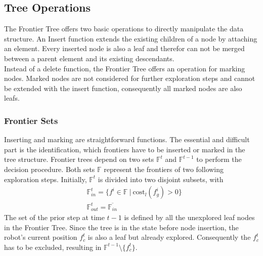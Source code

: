 \documentclass[twocolumn]{svjour3}[2016]
\begin{document}
\subsection{Tree Operations}
\label{tfta:operations}
The Frontier Tree offers two basic operations to directly manipulate the data structure. An Insert function extends the existing children of a node by attaching an element. Every inserted node is also a leaf and therefor can not be merged between a parent element and its existing descendants.\\
Instead of a delete function, the Frontier Tree offers an operation for marking nodes. Marked nodes are not considered for further exploration steps and cannot be extended with the insert function, consequently all marked nodes are also leafs.\\
\subsubsection{Frontier Sets}
Inserting and marking are straightforward functions. The essential and difficult part is the identification, which frontiers have to be inserted or marked in the tree structure. Frontier trees depend on two sets $\mathbb{F}^{t}$ and $\mathbb{F}^{t-1}$ to perform the decision procedure. Both sets $\mathbb{F}$ represent the frontiers of two following exploration steps. Initially, $\mathbb{F}^{t}$ is divided into two disjoint subsets, with
\begin{align}
&\mathbb{F}^t_{in} = \{ f^i \in \mathbb{F}\ |\ \textrm{cost}_l(f^i_g) > 0 \}\\
&\mathbb{F}^t_{out} = \overline{\mathbb{F}_{in}}
\end{align}
The set of the prior step at time $t-1$ is defined by all the unexplored leaf nodes in the Frontier Tree. Since the tree is in the state before node insertion, the robot's current position $f^t_c$ is also a leaf but already explored. Consequently the $f^t_c$ has to be excluded, resulting in $\mathbb{F}^{t-1}\text{\textbackslash}\{f^t_c\}$.
\end{document}
